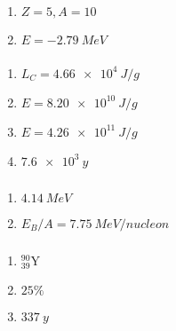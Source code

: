 \documentclass{article}
\begin{document}
\begin{enumerate}
  \item $Z = 5, A = 10$

  \item $E = \qty{-2.79}{MeV}$
\end{enumerate}

\setcounter{subsubsection}{46}
\subsubsection{}

\begin{enumerate}
  \item $L_C = \qty{4.66e4}{J/g}$

  \item $E = \qty{8.20e10}{J/g}$

  \item $E = \qty{4.26e11}{J/g}$

  \item $\qty{7.6e3}{y}$
\end{enumerate}

\setcounter{subsubsection}{48}
\subsubsection{}

\begin{enumerate}
  \item $\qty{4.14}{MeV}$

  \item $E_B / A = \qty{7.75}{MeV/nucleon}$
\end{enumerate}

\setcounter{subsubsection}{50}
\subsubsection{}

\begin{enumerate}
  \item $^{90}_{39} \text{Y}$

  \item $25\%$

  \item $\qty{337}{y}$
\end{enumerate}

\setcounter{subsubsection}{52}
\subsubsection{}
\end{document}
